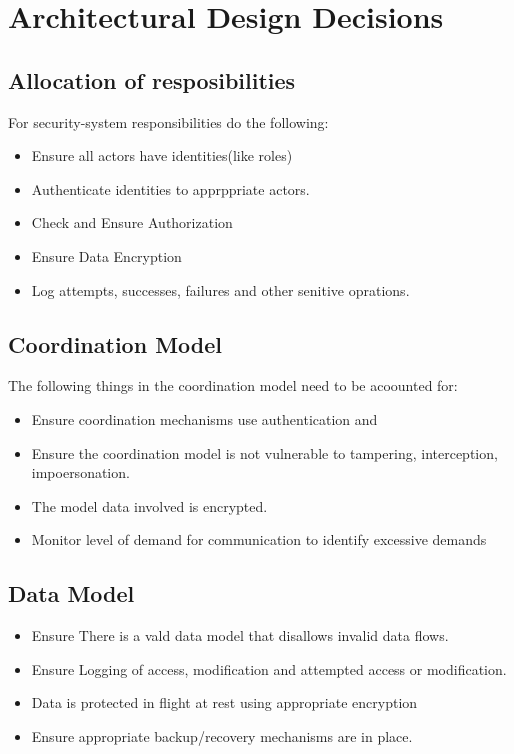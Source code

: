 \documentclass[a4paper]{report}
\begin{document}
\section{Architectural Design Decisions}
\subsection{Allocation of resposibilities}
For security-system responsibilities do the following:
\begin{itemize}
\item Ensure all actors have identities(like roles)
\item Authenticate identities to apprppriate actors.
\item Check and Ensure Authorization
\item Ensure Data Encryption
\item Log attempts, successes, failures and other senitive oprations.
\end{itemize}
\subsection{Coordination Model}
The following things in the coordination model need to be acoounted for:
\begin{itemize}
\item Ensure coordination mechanisms use authentication and 
\item Ensure the coordination model is not vulnerable to tampering, interception, impoersonation.
\item The model data involved is encrypted.
\item Monitor level of demand for communication to identify excessive demands
\end{itemize}
\subsection{Data Model}
\begin{itemize}
\item Ensure There is a vald data model that disallows invalid data flows.
\item Ensure Logging of access, modification and attempted access or modification.
\item Data is protected in flight at rest using appropriate encryption
\item Ensure appropriate backup/recovery mechanisms are in place. 
\end{itemize}
\end{document}
